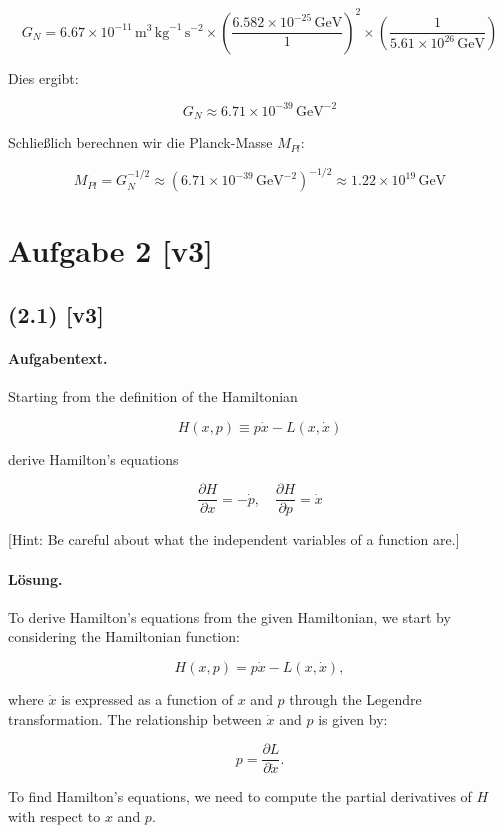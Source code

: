 \documentclass[11pt,a4paper]{article}
\begin{document}
\[
G_N = 6.67 \times 10^{-11} \, \mathrm{m}^3 \, \mathrm{kg}^{-1} \, \mathrm{s}^{-2} \times \left( \frac{6.582 \times 10^{-25} \, \text{GeV}}{1} \right)^2 \times \left( \frac{1}{5.61 \times 10^{26} \, \text{GeV}} \right)
\]

Dies ergibt:

\[
G_N \approx 6.71 \times 10^{-39} \, \text{GeV}^{-2}
\]

Schließlich berechnen wir die Planck-Masse $M_{Pl}$:

\[
M_{Pl} = G_N^{-1/2} \approx (6.71 \times 10^{-39} \, \text{GeV}^{-2})^{-1/2} \approx 1.22 \times 10^{19} \, \text{GeV}
\]

\section*{Aufgabe 2 [v3]}
\subsection*{(2.1) [v3]}
\paragraph{Aufgabentext.}
Starting from the definition of the Hamiltonian

$$
H(x, p) \equiv p \dot{x}-L(x, \dot{x})
$$

derive Hamilton's equations

$$
\frac{\partial H}{\partial x}=-\dot{p}, \quad \frac{\partial H}{\partial p}=\dot{x}
$$

[Hint: Be careful about what the independent variables of a function are.]

\paragraph{Lösung.}
To derive Hamilton's equations from the given Hamiltonian, we start by considering the Hamiltonian function:

$$
H(x, p) = p \dot{x} - L(x, \dot{x}),
$$

where \( \dot{x} \) is expressed as a function of \( x \) and \( p \) through the Legendre transformation. The relationship between \( \dot{x} \) and \( p \) is given by:

$$
p = \frac{\partial L}{\partial \dot{x}}.
$$

To find Hamilton's equations, we need to compute the partial derivatives of \( H \) with respect to \( x \) and \( p \).
\end{document}
